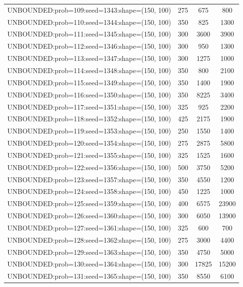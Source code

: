 \begin{longtable}{lccc}
UNBOUNDED:prob=109:seed=1343:shape=(150, 100) &      275 &   675 &    800 \\
UNBOUNDED:prob=110:seed=1344:shape=(150, 100) &      350 &   825 &   1300 \\
UNBOUNDED:prob=111:seed=1345:shape=(150, 100) &      300 &  3600 &   3900 \\
UNBOUNDED:prob=112:seed=1346:shape=(150, 100) &      300 &   950 &   1300 \\
UNBOUNDED:prob=113:seed=1347:shape=(150, 100) &      300 &  1275 &   1000 \\
UNBOUNDED:prob=114:seed=1348:shape=(150, 100) &      350 &   800 &   2100 \\
UNBOUNDED:prob=115:seed=1349:shape=(150, 100) &      350 &  1400 &   1900 \\
UNBOUNDED:prob=116:seed=1350:shape=(150, 100) &      350 &  8225 &   3400 \\
UNBOUNDED:prob=117:seed=1351:shape=(150, 100) &      325 &   925 &   2200 \\
UNBOUNDED:prob=118:seed=1352:shape=(150, 100) &      425 &  2175 &   1900 \\
UNBOUNDED:prob=119:seed=1353:shape=(150, 100) &      250 &  1550 &   1400 \\
UNBOUNDED:prob=120:seed=1354:shape=(150, 100) &      275 &  2875 &   5800 \\
UNBOUNDED:prob=121:seed=1355:shape=(150, 100) &      325 &  1525 &   1600 \\
UNBOUNDED:prob=122:seed=1356:shape=(150, 100) &      500 &  3750 &   5200 \\
UNBOUNDED:prob=123:seed=1357:shape=(150, 100) &      350 &  4550 &   1200 \\
UNBOUNDED:prob=124:seed=1358:shape=(150, 100) &      450 &  1225 &   1000 \\
UNBOUNDED:prob=125:seed=1359:shape=(150, 100) &      400 &  6575 &  23900 \\
UNBOUNDED:prob=126:seed=1360:shape=(150, 100) &      300 &  6050 &  13900 \\
UNBOUNDED:prob=127:seed=1361:shape=(150, 100) &      325 &   600 &    700 \\
UNBOUNDED:prob=128:seed=1362:shape=(150, 100) &      275 &  3000 &   4400 \\
UNBOUNDED:prob=129:seed=1363:shape=(150, 100) &      350 &  4750 &   5000 \\
UNBOUNDED:prob=130:seed=1364:shape=(150, 100) &      300 & 17825 &  15200 \\
UNBOUNDED:prob=131:seed=1365:shape=(150, 100) &      350 &  8550 &   6100 \\

\end{longtable}
